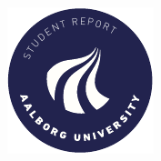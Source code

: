 \begin{titlepage}
   \vfill %
   \begin{center} %
     \includegraphics[width=0.2\paperwidth]{aaugraphics/aau_logo_circle_en.pdf}
   \end{center}
 \end{titlepage}
 \clearpage
